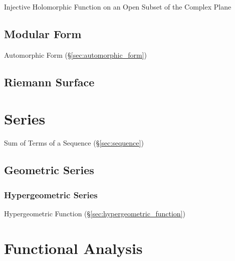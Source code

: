 Injective Holomorphic Function on an Open Subset of the Complex Plane



\subsection{Modular Form}\label{sec:modular_form}

Automorphic Form (\S\ref{sec:automorphic_form})



\subsection{Riemann Surface}\label{sec:riemann_surface}



\section{Series}\label{sec:series}

Sum of Terms of a Sequence (\S\ref{sec:sequence})



\subsection{Geometric Series}\label{sec:geometric_series}

\subsubsection{Hypergeometric Series}\label{sec:hypergeometric_series}

Hypergeometric Function (\S\ref{sec:hypergeometric_function})



\section{Functional Analysis}\label{sec:functional_analysis}

